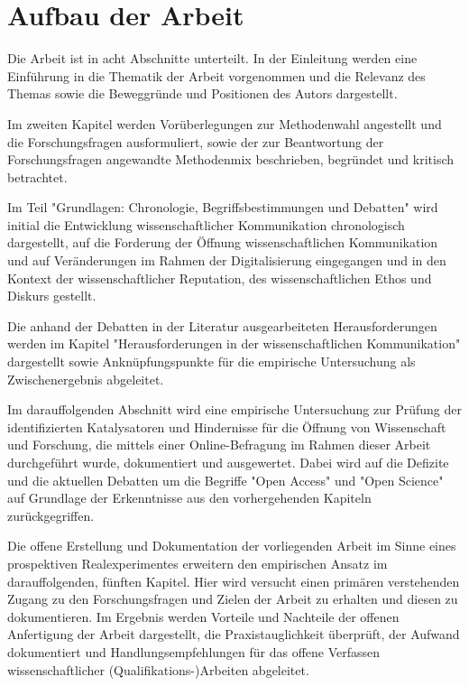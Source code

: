 \section{Aufbau der Arbeit}

Die Arbeit ist in acht Abschnitte unterteilt. In der Einleitung werden eine Einführung in die Thematik der Arbeit vorgenommen und die Relevanz des Themas sowie die Beweggründe und Positionen des Autors dargestellt.

Im zweiten Kapitel werden Vorüberlegungen zur Methodenwahl angestellt und die Forschungsfragen ausformuliert, sowie der zur Beantwortung der Forschungsfragen angewandte Methodenmix beschrieben, begründet und kritisch betrachtet.

Im Teil "Grundlagen: Chronologie, Begriffsbestimmungen und Debatten" wird initial die Entwicklung wissenschaftlicher Kommunikation chronologisch dargestellt, auf die Forderung der Öffnung wissenschaftlichen Kommunikation und auf Veränderungen im Rahmen der Digitalisierung eingegangen und in den Kontext der wissenschaftlicher Reputation, des wissenschaftlichen Ethos und Diskurs gestellt.

Die anhand der Debatten in der Literatur ausgearbeiteten Herausforderungen werden im Kapitel "Herausforderungen in der wissenschaftlichen Kommunikation" dargestellt sowie Anknüpfungspunkte für die empirische Untersuchung als Zwischenergebnis abgeleitet.

Im darauffolgenden Abschnitt wird eine empirische Untersuchung zur Prüfung der identifizierten Katalysatoren und Hindernisse für die Öffnung von Wissenschaft und Forschung, die mittels einer Online-Befragung im Rahmen dieser Arbeit durchgeführt wurde, dokumentiert und ausgewertet. Dabei wird auf die Defizite und die aktuellen Debatten um die Begriffe "Open Access" und "Open Science" auf Grundlage der Erkenntnisse aus den vorhergehenden Kapiteln zurückgegriffen.

Die offene Erstellung und Dokumentation der vorliegenden Arbeit im Sinne eines prospektiven Realexperimentes erweitern den empirischen Ansatz im darauffolgenden, fünften Kapitel. Hier wird versucht einen primären verstehenden Zugang zu den Forschungsfragen und Zielen der Arbeit zu erhalten und diesen zu dokumentieren. Im Ergebnis werden Vorteile und Nachteile der offenen Anfertigung der Arbeit dargestellt, die Praxistauglichkeit überprüft, der Aufwand dokumentiert und Handlungsempfehlungen für das offene Verfassen wissenschaftlicher (Qualifikations-)Arbeiten abgeleitet.

